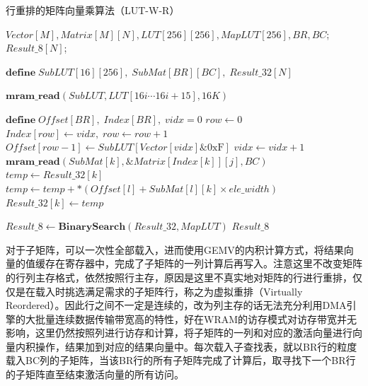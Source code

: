 \begin{algorithm}[!htbp]
    \caption{行重排的矩阵向量乘算法（LUT-W-R）}
    \label{LUT-W-R}
    \begin{algorithmic}[1]
        \Require $Vector[M], Matrix[M][N], LUT[256][256], MapLUT[256], BR, BC$; %
        \Ensure $Result\_8[N]$; %

        \State $\textbf{define}\; SubLUT[16][256],\;SubMat[BR][BC],\;Result\_32[N]$
        
            \State $\textbf{mram\_read}(SubLUT, LUT[16i \cdots 16i + 15], 16K)$
            \Comment{\textcolor{blue}{parallel read}}

            \State $\textbf{define}\; Offset[BR],\;Index[BR],\;vidx=0$
                \State $row \gets 0$
                \Comment{\textcolor{blue}{parallel in BR for each tasklet}}
                        \State $Index[row] \gets vidx,\;row \gets row + 1$
                        \State $Offset[row-1] \gets SubLUT[Vector[vidx] \& \text{0xF}]$
                    \EndIf
                    \State $vidx \gets vidx + 1$
                \EndWhile
                    \Comment{\textcolor{blue}{parallel in BR for each tasklet}}
                        \State $\textbf{mram\_read}(SubMat[k], \&Matrix[Index[k]][j], BC)$
                    \EndFor
                    \Comment{\textcolor{blue}{parallel in BC for each tasklet}}
                        \State $temp \gets Result\_32[k]$
                            \State $temp \gets temp + *(Offset[l] + SubMat[l][k] \times ele\_width)$
                        \EndFor
                        \State $Result\_32[k] \gets temp$
                    \EndFor
                \EndFor
            \EndWhile
        \EndFor

        \State $Result\_8 \gets \textbf{BinarySearch}(Result\_32, MapLUT)$
        \Comment{\textcolor{blue}{parallel in N}}
        \State \Return $Result\_8$
    \end{algorithmic}
\end{algorithm}

对于子矩阵，可以一次性全部载入，进而使用GEMV的内积计算方式，将结果向量的值缓存在寄存器中，完成了子矩阵的一列计算后再写入。注意这里不改变矩阵的行列主存格式，依然按照行主存，原因是这里不真实地对矩阵的行进行重排，仅仅是在载入时挑选满足需求的子矩阵行，称之为虚拟重排（Virtually Reordered）。因此行之间不一定是连续的，改为列主存的话无法充分利用DMA引擎的大批量连续数据传输带宽高的特性，好在WRAM的访存模式对访存带宽并无影响\cite{BenchmarkingMutlu}，这里仍然按照列进行访存和计算，将子矩阵的一列和对应的激活向量进行向量内积操作，结果加到对应的结果向量中。每次载入子查找表，就以BR行的粒度载入BC列的子矩阵，当该BR行的所有子矩阵完成了计算后，取寻找下一个BR行的子矩阵直至结束激活向量的所有访问。

